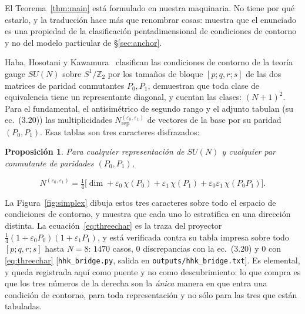\documentclass[11pt,a4paper]{article}
\newtheorem{proposition}{Proposición}
\newcommand{\ZZ}{\mathbb{Z}}
\newcommand{\su}[1]{SU(#1)}
\newenvironment{keyeq}
  {\begin{center}\setlength{\fboxsep}{9pt}\setlength{\fboxrule}{0.8pt}%
   \begin{lrbox}{\keyeqbox}\begin{minipage}{0.88\textwidth}}
  {\end{minipage}\end{lrbox}%
   \fcolorbox{hdrblue!55}{hdrblue!6}{\usebox{\keyeqbox}}\end{center}}
\begin{document}
El Teorema~\ref{thm:main} está formulado en nuestra maquinaria. No tiene por qué estarlo, y la
traducción hace más que renombrar cosas: muestra que el enunciado es una propiedad de la
clasificación pentadimensional de condiciones de contorno y no del modelo particular de
\S\ref{sec:anchor}.

Haba, Hosotani y Kawamura~\cite{HHK} clasifican las condiciones de contorno de la teoría gauge
$\su N$ sobre $S^1/\ZZ_2$ por los tamaños de bloque $[p;q,r;s]$ de las dos matrices de paridad
conmutantes $P_0,P_1$, demuestran que toda clase de equivalencia tiene un representante diagonal, y
cuentan las clases: $(N+1)^2$. Para el fundamental, el antisimétrico de segundo rango y el adjunto
tabulan (su ec.~(3.20)) las multiplicidades $N^{(\varepsilon_0,\varepsilon_1)}_{\mathrm{rep}}$ de
vectores de la base por su paridad $(P_0,P_1)$. Esas tablas son tres caracteres disfrazados:

\begin{proposition}\label{prop:three}
Para cualquier representación de $\su N$ y cualquier par conmutante de paridades $(P_0,P_1)$,
\begin{keyeq}
\begin{equation}\label{eq:threechar}
N^{(\varepsilon_0,\varepsilon_1)}
=\tfrac14\Big[\dim+\varepsilon_0\,\chi(P_0)+\varepsilon_1\,\chi(P_1)
+\varepsilon_0\varepsilon_1\,\chi(P_0P_1)\Big].
\end{equation}
\end{keyeq}
\end{proposition}

\noindent La Figura~\ref{fig:simplex} dibuja estos tres caracteres sobre todo el espacio de
condiciones de contorno, y muestra que cada uno lo estratifica en una dirección distinta. La
ecuación~\eqref{eq:threechar} es la traza del proyector
$\frac14(1+\varepsilon_0P_0)(1+\varepsilon_1P_1)$, y está verificada contra su tabla impresa sobre
todo $[p;q,r;s]$ hasta $N=8$: $1470$ casos, $0$ discrepancias con la ec.~(3.20) y $0$ con
\eqref{eq:threechar} [\texttt{hhk\_bridge.py}, salida en \texttt{outputs/hhk\_bridge.txt}]. Es
elemental, y queda registrada aquí como puente y no como descubrimiento: lo que compra es que los
tres números de la derecha son la \emph{única} manera en que entra una condición de contorno, para
toda representación y no sólo para las tres que están tabuladas.
\end{document}
